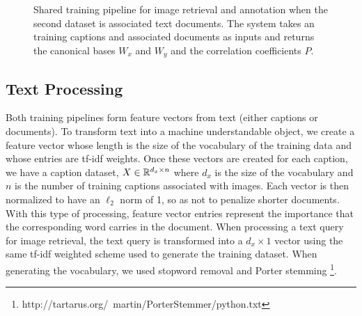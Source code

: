 \begin{figure}[th!]
\begin{center}
    \caption{Shared training pipeline for image retrieval and annotation when the second
      dataset is associated text documents. The system takes an training captions and
      associated documents as inputs and returns the canonical bases $W_x$ and $W_y$ and
      the correlation coefficients $P$.}
  \label{fig:chpt9:training_tt}  
\end{center}
\end{figure}

\subsection{Text Processing}

Both training pipelines form feature vectors from text (either captions or documents). To
transform text into a machine understandable object, we create a feature vector whose
length is the size of the vocabulary of the training data and whose entries are tf-idf
weights. Once these vectors are created for each caption, we have a caption dataset,
$X\in\mathbb{R}^{d_x\times n}$ where $d_x$ is the size of the vocabulary and $n$ is the number
of training captions associated with images. Each vector is then normalized to have an
$\ell_2$ norm of 1, so as not to penalize shorter documents. With this type of processing,
feature vector entries represent the importance that the corresponding word
carries in the document. When processing a text query for image retrieval, the text query
is transformed into a $d_x\times 1$ vector using the same tf-idf weighted scheme used to
generate the training dataset. When generating the vocabulary, we used stopword removal
and Porter stemming \footnote{http://tartarus.org/~martin/PorterStemmer/python.txt}.

